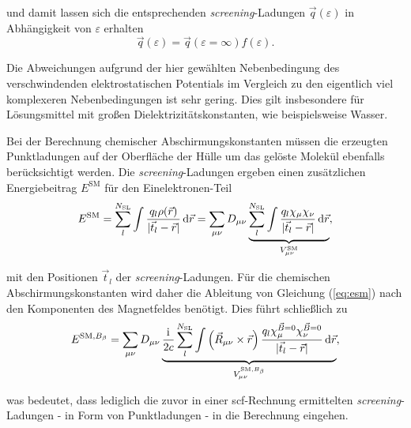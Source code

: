 und damit lassen sich die entsprechenden \textit{screening}-Ladungen $\vec{q}(\varepsilon)$ in Abhängigkeit von $\varepsilon$ erhalten
	\begin{equation}
	\vec{q}(\varepsilon)=\vec{q}(\varepsilon=\infty)f(\varepsilon).
	\end{equation}
	
Die Abweichungen aufgrund der hier gewählten Nebenbedingung des verschwindenden elektrostatischen Potentials im Vergleich zu den eigentlich viel komplexeren Nebenbedingungen ist sehr gering.\supercite{klamt1993cosmo} Dies gilt insbesondere für Lösungsmittel mit großen Dielektrizitätskonstanten, wie beispielsweise Wasser.

Bei der Berechnung chemischer Abschirmungskonstanten müssen die erzeugten Punktladungen auf der Oberfläche der Hülle um das gelöste Molekül ebenfalls berücksichtigt werden. Die \textit{screening}-Ladungen ergeben einen zusätzlichen Energiebeitrag $E^{\textrm{SM}}$ für den Einelektronen-Teil\supercite{cammi1999nuclear}
	\begin{equation}\label{eq:esm}
	E^{\textrm{SM}}=\sum_{l}^{N_{\textrm{SL}}}\int\frac{q_l\rho(\vec{r})}{\vert\vec{t}_l-\vec{r}\vert}\mathop{}\!\mathrm{d}\vec{r}=\sum_{\mu\nu}D_{\mu\nu}\underbrace{\sum_l^{N_{\textrm{SL}}}\int\frac{q_l\chi_\mu\chi_\nu}{\vert\vec{t}_l-\vec{r}\vert}\mathop{}\!\mathrm{d}\vec{r}}_{V_{\mu\nu}^{\textrm{SM}}},
	\end{equation}
	
mit den Positionen $\vec{t}_l$ der \textit{screening}-Ladungen. Für die chemischen Abschirmungskonstanten wird daher die Ableitung von Gleichung (\ref{eq:esm}) nach den Komponenten des Magnetfeldes benötigt. Dies führt schließlich zu
	\begin{equation}\label{eq:esmdb}
	E^{\textrm{SM},B_\beta}=\sum_{\mu\nu}D_{\mu\nu}\underbrace{\frac{\mathrm{i}\mkern1mu}{2c}\sum_l^{N_{\textrm{SL}}}\int\left(\vec{R}_{\mu\nu}\times\vec{r}\right)\frac{q_l\chi_\mu^{\vec{B}=0}\chi_\nu^{\vec{B}=0}}{\vert\vec{t}_l-\vec{r}\vert}\mathop{}\!\mathrm{d}\vec{r}}_{V_{\mu\nu}^{\textrm{SM},B_\beta}},
	\end{equation}

was bedeutet, dass lediglich die zuvor in einer \ac{scf}-Rechnung ermittelten \textit{screening}-Ladungen - in Form von Punktladungen - in die Berechnung eingehen.  
	
